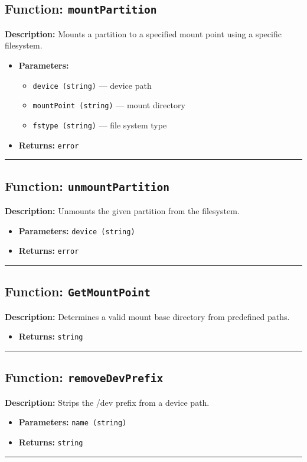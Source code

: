 \documentclass[12pt,a4paper]{article}
\begin{document}
\subsection*{Function: \texttt{mountPartition}}
\textbf{Description:} Mounts a partition to a specified mount point using a specific filesystem.
\begin{itemize}[leftmargin=2cm,label={--}]
  \item \textbf{Parameters:}
  \begin{itemize}
    \item \texttt{device (string)} — device path
    \item \texttt{mountPoint (string)} — mount directory
    \item \texttt{fstype (string)} — file system type
  \end{itemize}
  \item \textbf{Returns:} \texttt{error}
\end{itemize}
\hrule\vspace{1em}

\subsection*{Function: \texttt{unmountPartition}}
\textbf{Description:} Unmounts the given partition from the filesystem.
\begin{itemize}[leftmargin=2cm,label={--}]
  \item \textbf{Parameters:} \texttt{device (string)}
  \item \textbf{Returns:} \texttt{error}
\end{itemize}
\hrule\vspace{1em}

\subsection*{Function: \texttt{GetMountPoint}}
\textbf{Description:} Determines a valid mount base directory from predefined paths.
\begin{itemize}[leftmargin=2cm,label={--}]
  \item \textbf{Returns:} \texttt{string}
\end{itemize}
\hrule\vspace{1em}

\subsection*{Function: \texttt{removeDevPrefix}}
\textbf{Description:} Strips the /dev prefix from a device path.
\begin{itemize}[leftmargin=2cm,label={--}]
  \item \textbf{Parameters:} \texttt{name (string)}
  \item \textbf{Returns:} \texttt{string}
\end{itemize}
\hrule\vspace{1em}
\end{document}
